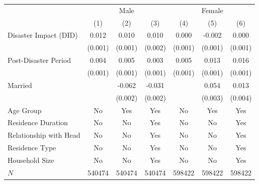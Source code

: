 \documentclass[serif, aspectratio=169]{beamer}
\begin{document}
\begin{frame}[label=nonregular_status]
\begin{table}[htbp]
\begin{tabular}{@{}l*{6}{c}@{}}
          &\multicolumn{3}{c}{Male}                                &\multicolumn{3}{c}{Female}                              \\\cmidrule(lr){2-4}\cmidrule(lr){5-7}
          &\multicolumn{1}{c}{(1)}         &\multicolumn{1}{c}{(2)}         &\multicolumn{1}{c}{(3)}         &\multicolumn{1}{c}{(4)}         &\multicolumn{1}{c}{(5)}         &\multicolumn{1}{c}{(6)}         \\
\toprule
Disaster Impact (DID)&    0.012\sym{***}&    0.010\sym{***}&    0.010\sym{***}&    0.000         &   -0.002\sym{**} &    0.000         \\
          &  (0.001)         &  (0.001)         &  (0.002)         &  (0.001)         &  (0.001)         &  (0.001)         \\
\addlinespace
Post-Disaster Period&    0.004\sym{**} &    0.005\sym{***}&    0.003\sym{**} &    0.005\sym{***}&    0.013\sym{***}&    0.016\sym{***}\\
          &  (0.001)         &  (0.001)         &  (0.001)         &  (0.001)         &  (0.001)         &  (0.001)         \\
\addlinespace
Married   &                  &   -0.062\sym{***}&   -0.031\sym{***}&                  &    0.054\sym{***}&    0.013\sym{***}\\
          &                  &  (0.002)         &  (0.002)         &                  &  (0.003)         &  (0.004)         \\
\midrule
Age Group &       No         &      Yes         &      Yes         &       No         &      Yes         &      Yes         \\
Residence Duration&       No         &       No         &      Yes         &       No         &       No         &      Yes         \\
Relationship with Head&       No         &       No         &      Yes         &       No         &       No         &      Yes         \\
Residence Type&       No         &       No         &      Yes         &       No         &       No         &      Yes         \\
Household Size&       No         &       No         &      Yes         &       No         &       No         &      Yes         \\
$\textit{N}$&   540474         &   540474         &   540474         &   598422         &   598422         &   598422         \\

\end{tabular}
\end{table}
\end{frame}
\end{document}

